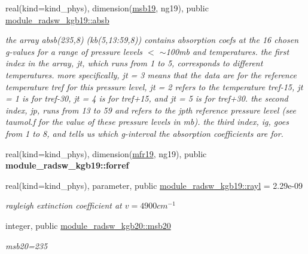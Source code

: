\begin{DoxyCompactItemize}
real(kind=kind\+\_\+phys), dimension(\hyperlink{group__module__radsw__kgbnn_ga42771fcf9dd17b5c9d0d03cb2bf1c923}{msb19}, ng19), public \hyperlink{group__module__radsw__kgbnn_gad1171c012a1615c4b98eb3e95276867d}{module\+\_\+radsw\+\_\+kgb19\+::absb}
\begin{DoxyCompactList}\small\item\em the array absb(235,8) (kb(5,13\+:59,8)) contains absorption coefs at the 16 chosen g-\/values for a range of pressure levels $<$ $\sim$100mb and temperatures. the first index in the array, jt, which runs from 1 to 5, corresponds to different temperatures. more specifically, jt = 3 means that the data are for the reference temperature tref for this pressure level, jt = 2 refers to the temperature tref-\/15, jt = 1 is for tref-\/30, jt = 4 is for tref+15, and jt = 5 is for tref+30. the second index, jp, runs from 13 to 59 and refers to the jpth reference pressure level (see taumol.\+f for the value of these pressure levels in mb). the third index, ig, goes from 1 to 8, and tells us which g-\/interval the absorption coefficients are for. \end{DoxyCompactList}\item 
\mbox{\label{group__module__radsw__kgbnn_gabb4c30ad8e82694b33df78bb2687df6d}} 
real(kind=kind\+\_\+phys), dimension(\hyperlink{group__module__radsw__kgbnn_ga57f837ef4316dc2441bca3fde3998156}{mfr19}, ng19), public {\bfseries module\+\_\+radsw\+\_\+kgb19\+::forref}
\item 
\mbox{\label{group__module__radsw__kgbnn_gac79ad61e8d246d6075664df4201373d7}} 
real(kind=kind\+\_\+phys), parameter, public \hyperlink{group__module__radsw__kgbnn_gac79ad61e8d246d6075664df4201373d7}{module\+\_\+radsw\+\_\+kgb19\+::rayl} = 2.\+29e-\/09
\begin{DoxyCompactList}\small\item\em rayleigh extinction coefficient at $v=4900cm^{-1}$ \end{DoxyCompactList}\item 
\mbox{\label{group__module__radsw__kgbnn_ga385f5b8c61ed1de7aa3bbb6bd65f522f}} 
integer, public \hyperlink{group__module__radsw__kgbnn_ga385f5b8c61ed1de7aa3bbb6bd65f522f}{module\+\_\+radsw\+\_\+kgb20\+::msb20}
\begin{DoxyCompactList}\small\item\em msb20=235 \end{DoxyCompactList}\item 

\end{DoxyCompactItemize}
